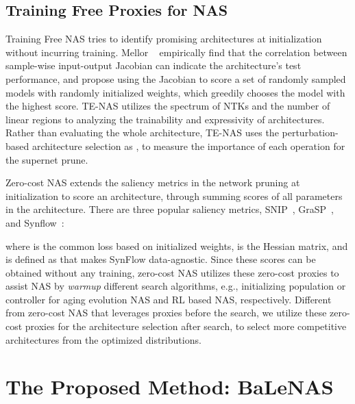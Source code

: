 \documentclass[10pt,twocolumn,letterpaper]{article}
\begin{document}
\subsection{Training Free Proxies for NAS}
\label{sec2.3}


Training Free NAS tries to identify promising architectures at initialization without incurring training. Mellor \etal~\cite{mellor2020neural} empirically find that the correlation between sample-wise input-output Jacobian can indicate the architecture’s test performance, and propose using the Jacobian to score a set of randomly sampled models with randomly initialized weights, which greedily chooses the model with the highest score. TE-NAS \cite{chen2021neural} utilizes the spectrum of NTKs and the number of linear regions to analyzing the trainability and expressivity of architectures. Rather than evaluating the whole architecture, TE-NAS uses the perturbation-based architecture selection as \cite{Rethinking2021}, to measure the importance of each operation for the supernet prune. 

Zero-cost NAS \cite{abdelfattah2021zero} extends the saliency metrics in the network pruning at initialization to score an architecture, through summing scores of all parameters  in the architecture. There are three popular saliency metrics, SNIP~\cite{lee2018snip}, GraSP~\cite{wang2019picking}, and Synflow~\cite{tanaka2020pruning}:

where  is the common loss based on initialized weights,  is the Hessian matrix, and  is defined as  that makes SynFlow data-agnostic. Since these scores can be obtained without any training, zero-cost NAS utilizes these zero-cost proxies to assist NAS by \textit{warmup} different search algorithms, e.g., initializing population or controller for aging evolution NAS and RL based NAS, respectively. Different from zero-cost NAS that leverages proxies before the search, we utilize these zero-cost proxies for the architecture selection after search, to select more competitive architectures from the optimized distributions.


\section{The Proposed Method: BaLeNAS}

\label{sec3}
\end{document}
